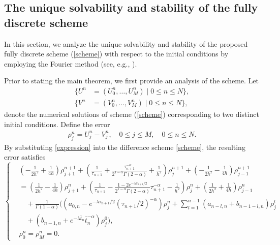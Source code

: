 \documentclass[10pt, reqno]{amsart}
\theoremstyle{remark}
\theoremstyle{definition}
\numberwithin{table}{section}
\begin{document}
\subsection{The unique solvability and stability of the fully discrete scheme} 
\label{sectionsolvable}
In this section, we analyze the unique solvability and stability of the proposed fully discrete scheme (\ref{scheme}) with respect to the initial conditions by employing the Fourier method (see, e.g., \cite{chen2007, Liu2018, zhao2021}).

Prior to stating the main theorem, we first provide an analysis of the scheme. Let
\begin{align*}
    \{U^n &= (U_0^n, \ldots, U_M^n) \mid 0 \le n \le N\},\\
    \{V^n &= (V_0^n, \ldots, V_M^n) \mid 0 \le n \le N\},
\end{align*}
denote the numerical solutions of scheme (\ref{scheme}) corresponding to two distinct initial conditions. Define the error \begin{align}
    \rho_j^n = U_j^n - V_j^n,\quad 0\leq j\leq M ,\quad 0\le n\le N. \label{expression}
\end{align}
By substituting \eqref{expression} into the difference scheme \eqref{scheme}, the resulting error satisfies
\begin{equation}\label{errorQ}
\left\{
\begin{aligned}
&
(-\tfrac{1}{2 h^2}+\tfrac{1}{4h}) \rho_{j+1}^{n+1}
+ (\tfrac{1}{\tau_{n+1}}+\tfrac{\tau_{n+1}^{-\alpha}}{2^{1-\alpha}\Gamma(2-\alpha)}+\tfrac{1}{h^2}) \rho_j^{n+1}
+ (-\tfrac{1}{2 h^2}-\tfrac{1}{4h}) \rho_{j-1}^{n+1}
 \\
&=
(\tfrac{1}{2 h^2}-\tfrac{1}{4h}) \rho_{j+1}^{n}
+ (\tfrac{1}{\tau_{n+1}}-\tfrac{1-2e^{-\lambda {\tau_{n+1}}/{2}}}{2^{1-\alpha}\Gamma(2-\alpha)}\tau_{n+1}^{-\alpha}-\tfrac{1}{h^2}) \rho_j^{n}
+ (\tfrac{1}{2 h^2}+\tfrac{1}{4h}) \rho_{j-1}^{n} \\
&\quad
+ \tfrac{1}{\Gamma(1-\alpha)}
(
(a_{0, n}-e^{-\lambda {\tau_{n+1}}/{2}} ({\tau_{n+1}}/{2})^{-\alpha}) \rho_j^n
+ \sum_{l=1}^{n-1} (a_{n-l, n}+b_{n-1-l, n}) \rho_j^l\\
&\quad+ (b_{n-1, n}+{e^{-\lambda \bar{t}_n}}{\bar{t}_n^{-\alpha}}) \rho_j^0
), \\
&\rho_0^n=\rho_M^n=0.
\end{aligned}
\right.
\end{equation}
\end{document}
